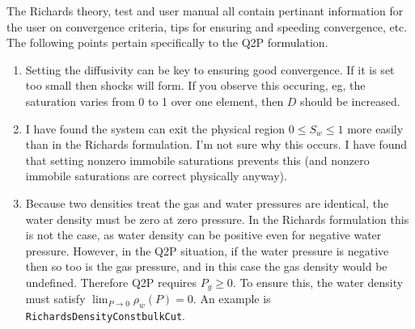 \documentclass[]{scrreprt}
\begin{document}
The Richards theory, test and user manual all contain pertinant
information for the user on convergence criteria, tips for ensuring
and speeding convergence, etc.  The following points pertain
specifically to the Q2P formulation.

\begin{enumerate}
\item Setting the diffusivity can be key to ensuring good convergence.
  If it is set too small then shocks will form.  If you observe this
  occuring, eg, the saturation   varies from 0 to 1 over one element,
  then $D$ should be increased. 

\item I have found the system can exit the physical region $0\leq
  S_{w} \leq 1$ more easily than in the Richards formulation.  I'm not
  sure why this occurs.  I have found that setting nonzero immobile
  saturations prevents this (and nonzero immobile saturations are
  correct physically anyway).

\item Because two densities treat the gas and water pressures are
  identical, the water density must be zero at zero pressure.  In the
  Richards formulation this is not the case, as water density can be
  positive even for negative water pressure.  However, in the Q2P
  situation, if the water pressure is negative then so too is the gas
  pressure, and in this case the gas density would be undefined.
  Therefore Q2P requires $P_{g}\geq 0$.  To ensure this, the water
  density must satisfy $\lim_{P\rightarrow 0}\rho_{w}(P) = 0$.  An
  example is {\tt RichardsDensityConstbulkCut}.

\end{enumerate}
\end{document}
